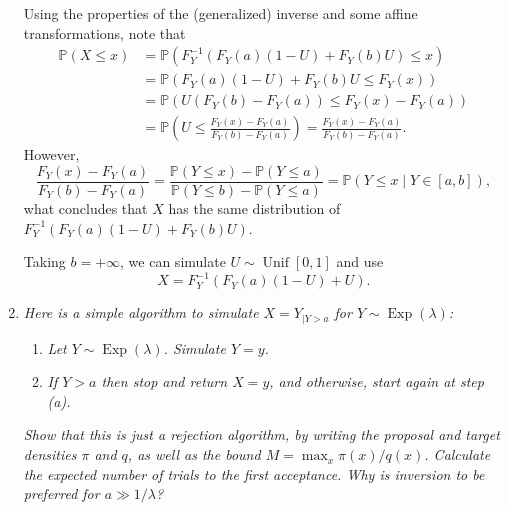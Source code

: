 \documentclass[a4paper,12pt]{article}
\newcommand{\unif}{\operatorname{Unif}}
\newcommand{\pr}{\mathbb{P}}
\theoremstyle{definition}
\begin{document}
\begin{enumerate}
    Using the properties of the (generalized) inverse and some affine
    transformations, note that
    \begin{equation*}
        \begin{split}
            \pr(X \le x) &= \pr(F_Y^{-1}(F_Y(a)(1 - U) + F_Y(b)U) \le x) \\
            &= \pr(F_Y(a)(1 - U) + F_Y(b)U \le F_Y(x)) \\
            &= \pr(U(F_Y(b) - F_Y(a)) \le F_Y(x) - F_Y(a)) \\
            &= \pr\left(U \le \frac{F_Y(x) - F_Y(a)}{F_Y(b) - F_Y(a)}\right) = \frac{F_Y(x) - F_Y(a)}{F_Y(b) - F_Y(a)}.
        \end{split}
    \end{equation*}
    However, 
    $$\frac{F_Y(x) - F_Y(a)}{F_Y(b) - F_Y(a)} = \frac{\pr(Y \le x) - \pr(Y \le
    a)}{\pr(Y \le b) - \pr(Y \le a)} = \pr(Y \le x \mid Y \in [a,b]),$$
    what concludes that $X$ has the same distribution of $F_Y^{-1}(F_Y(a)(1 -
    U) + F_Y(b)U)$. 

    Taking $b = +\infty$, we can simulate $U \sim \unif[0,1]$ and use 
    $$X = F_Y^{-1}(F_Y(a)(1 - U) + U).$$

    \item {\it Here is a simple algorithm to simulate $X = Y_{|Y > a}$ for $Y
    \sim \operatorname{Exp}(\lambda)$:}

    \begin{enumerate}
        \item {\it Let $Y \sim \operatorname{Exp}(\lambda)$. Simulate $Y = y$.}
        \item {\it If $Y > a$ then stop and return $X = y$, and otherwise, start again at step (a).}
    \end{enumerate}

    {\it Show that this is just a rejection algorithm, by writing the proposal
    and target densities $\pi$ and $q$, as well as the bound $M = \max_x
    \pi(x)/q(x)$. Calculate the expected number of trials to the first
    acceptance. Why is inversion to be preferred for $a \gg 1/\lambda$?}


\end{enumerate}
\end{document}
